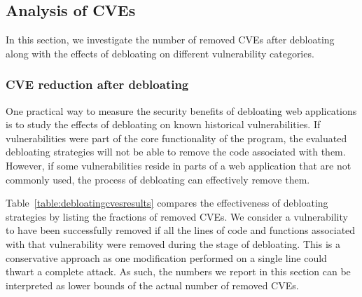 \subsection{Analysis of CVEs}
In this section, we investigate the number of removed CVEs after debloating
along with the effects of debloating on different vulnerability categories.

\subsubsection{CVE reduction after debloating}
\label{sec:cve_reduction}
One practical way to measure the security benefits of debloating web
applications is to study the effects of debloating on known historical
vulnerabilities. If vulnerabilities were part of the core functionality of the
program, the evaluated debloating strategies will not be able to remove the
code associated with them. However, if some vulnerabilities reside in parts
of a web application that are not commonly used, the process of debloating
can effectively remove them.


Table~\ref{table:debloatingcvesresults} compares the effectiveness of
debloating strategies by listing the fractions of removed CVEs. We consider
a vulnerability to have been successfully removed if all the lines of code
and functions associated with that vulnerability were removed during the
stage of debloating. This is a conservative approach as one modification
performed on a single line could thwart a complete attack. As such, the
numbers we report in this section can be interpreted as lower bounds of
the actual number of removed CVEs.


